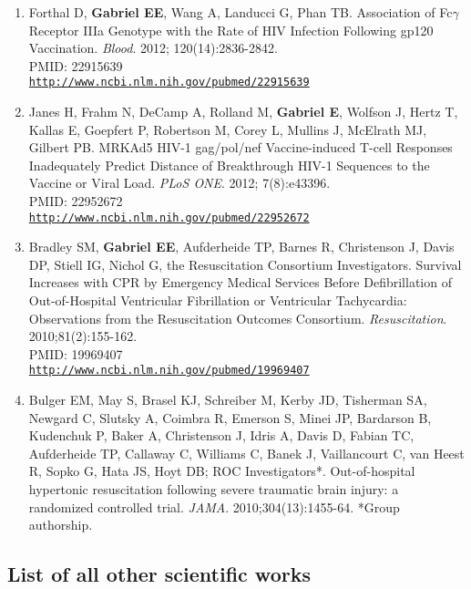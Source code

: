 \documentclass[12pt]{article}
\providecommand \url[1]{\href{#1}{#1}}
\renewcommand*\url[1]{\href{#1}{\texttt{#1}}}
\begin{document}
\begin{enumerate}
\item Forthal D, \textbf{Gabriel EE},  Wang A, Landucci G, Phan TB. Association of Fc$\gamma$ Receptor IIIa Genotype with the Rate of HIV Infection Following gp120 Vaccination. \emph{Blood}. 2012; 120(14):2836-2842.\\
PMID: 22915639 \\
\url{http://www.ncbi.nlm.nih.gov/pubmed/22915639}



\item Janes H, Frahm N, DeCamp A, Rolland M, \textbf{Gabriel E}, Wolfson J, Hertz T, Kallas E, Goepfert P, Robertson M, Corey L, Mullins J, McElrath MJ, Gilbert PB. MRKAd5 HIV-1 gag/pol/nef Vaccine-induced T-cell Responses Inadequately Predict Distance of Breakthrough HIV-1 Sequences to the Vaccine or Viral Load. \emph{PLoS ONE}. 2012; 7(8):e43396.\\
PMID: 22952672 \\
\url{http://www.ncbi.nlm.nih.gov/pubmed/22952672}


\item Bradley SM, \textbf{Gabriel EE}, Aufderheide TP, Barnes R, Christenson J,  Davis DP, Stiell IG, Nichol G, the Resuscitation Consortium Investigators. Survival Increases with CPR by Emergency Medical Services Before Defibrillation of Out-of-Hospital Ventricular Fibrillation or Ventricular Tachycardia: Observations from the Resuscitation Outcomes Consortium. \emph{Resuscitation}. 2010;81(2):155-162.\\
PMID: 19969407\\
\url{http://www.ncbi.nlm.nih.gov/pubmed/19969407}


 \item	Bulger EM, May S, Brasel KJ, Schreiber M, Kerby JD, Tisherman SA, Newgard C, Slutsky A, Coimbra R, Emerson S, Minei JP, Bardarson B, Kudenchuk P, Baker A, Christenson J, Idris A, Davis D, Fabian TC, Aufderheide TP, Callaway C, Williams C, Banek J, Vaillancourt C, van Heest R, Sopko G, Hata JS, Hoyt DB; ROC Investigators*. Out-of-hospital hypertonic resuscitation following severe traumatic brain injury: a randomized controlled trial. \emph{JAMA}. 2010;304(13):1455-64. *Group authorship.
\end{enumerate}






\subsection*{List of all other scientific works}
\end{document}
